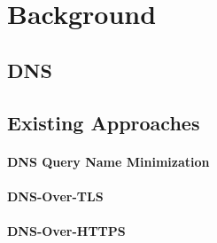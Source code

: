 \section{Background}

\subsection{DNS}

\subsection{Existing Approaches}
\paragraph{DNS Query Name Minimization}

\paragraph{DNS-Over-TLS}

\paragraph{DNS-Over-HTTPS}
